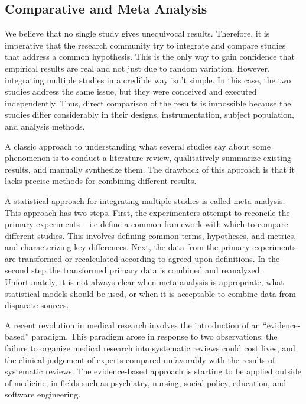 \subsection{Comparative and Meta Analysis}

We believe that no single study gives unequivocal results.
Therefore, it is imperative that the research community try 
to integrate and compare
studies that address a common hypothesis. This is the only way to gain 
confidence that empirical results are real and not just due to random 
variation. However, integrating multiple studies in a credible way isn't
simple. In this case, the two studies address the same issue, but they were 
conceived and executed independently. Thus, direct comparison of the results
is impossible because the studies differ considerably in their designs, 
instrumentation, subject population, and analysis methods.
 
A classic approach to understanding what several studies say about 
some phenomenon is to conduct a literature review, qualitatively 
summarize existing results, and manually synthesize them. The drawback 
of this approach is that it lacks precise methods for combining 
different results. 

A statistical approach for integrating multiple studies is called 
meta-analysis. This approach has two steps. First, the 
experimenters attempt to reconcile the primary experiments -- i.e define 
a common framework with which to compare different studies.  This involves
defining common terms, hypotheses, and metrics, and characterizing key 
differences.  Next, the data from the primary experiments are transformed 
or recalculated according to agreed upon definitions. In the second step
the transformed primary data is combined and reanalyzed.
Unfortunately, it is not always clear when meta-analysis is appropriate,  
what statistical models should be used, or when it is acceptable to 
combine data from disparate sources. 

A recent revolution in medical research involves the introduction of an
``evidence-based'' paradigm.  This paradigm arose in response to two
observations: the failure to organize medical research into systematic
reviews could cost lives, and the clinical judgement of experts compared
unfavorably with the results of systematic reviews.   The evidence-based 
approach is starting to be applied outside of medicine, in fields such as
psychiatry, nursing, social policy, education, and software engineering. 

